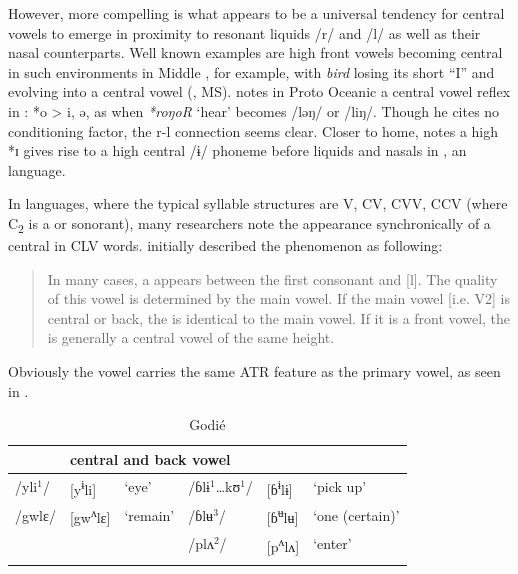 \documentclass[output=paper,newtxmath,modfonts,nonflat,draft]{langsci/langscibook}
\begin{document}
However, more compelling is what appears to be a universal tendency for central vowels to emerge in proximity to resonant liquids /r/ and /l/ as well as their nasal counterparts.  Well known examples are high front vowels becoming central in such environments in Middle , for example, with \textit{bird} losing its short “I” and evolving into a central vowel (\citeauthor{hickeyms}, MS). \citet[76]{Lynch2015} notes in Proto Oceanic a central vowel reflex in : *o > i, ə, as when \textit{*roŋoR} ‘hear’ becomes /ləŋ/ or /liŋ/.  Though he cites no conditioning factor, the r-l connection seems clear. Closer to home, \citet{Morton2012} notes a high *ɪ gives rise to a high central /ɨ/ phoneme before liquids and nasals in , an  language.  

In  languages, where the typical syllable structures are V, CV, CVV, CCV (where C\textsubscript{2} is a  or sonorant), many researchers note the appearance synchronically of a central  in CLV words.  \citet[98]{Marchese1979/1983} initially described the phenomenon as following:  
\begin{quote}
In many cases, a  appears between the first consonant and [l]. The quality of this vowel is determined by the main vowel.  If the main vowel [i.e. V2] is central or back, the  is identical to the main vowel.  If it is a front vowel, the  is generally a central vowel of the same height. 
\end{quote}

Obviously the vowel carries the same ATR feature as the primary vowel, as seen in .

\begin{table}
\caption{Godié}
\label{tab:zogbo:20}
\begin{tabular}{llllll}
\lsptoprule
\multicolumn{3}{l}{front vowel} & \multicolumn{3}{l}{central and back vowel}\\
\midrule
/yli$^1$/  & [y\textsuperscript{ɨ}li]  &  ‘eye’  &  /ɓlɨ$^1$…kʊ$^1$/ & [ɓ\textsuperscript{ɨ}lɨ] & ‘pick up’\\

/gwlɛ/ & [gw\textsuperscript{ʌ}lɛ] & ‘remain’ & /ɓlʉ$^3$/  &  [ɓ\textsuperscript{ʉ}lʉ]  & ‘one (certain)’\\

&&& /plʌ$^2$/  &  [p\textsuperscript{ʌ}lʌ]  & ‘enter’\\
\lspbottomrule
\end{tabular} 
\end{table}
\end{document}
